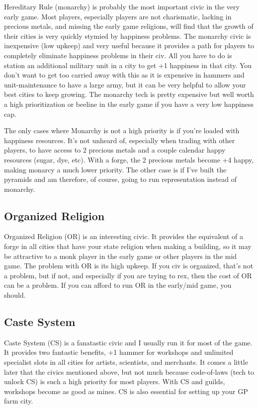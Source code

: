 \documentclass[10pt]{article}
\begin{document}
Hereditary Rule (monarchy) is probably the most important civic in the
very early game. Most players, especially players are not charismatic,
lacking in precious metals, and missing the early game religions, will
find that the growth of their cities is very quickly stymied by
happiness problems. The monarchy civic is inexpensive (low upkeep) and
very useful because it provides a path for players to completely
eliminate happiness problems in their civ. All you have to do is
station an additional military unit in a city to get +1 happiness in
that city. You don't want to get too carried away with this as it is
expensive in hammers and unit-maintenance to have a large army, but it
can be very helpful to allow your best cities to keep growing. The
monarchy tech is pretty expensive but well worth a high prioritization
or beeline in the early game if you have a very low happiness cap.

The only cases where Monarchy is not a high priority is if you're
loaded with happiness resources. It's not unheard of, especially when
trading with other players, to have access to 2 precious metals and a
couple calendar happy resources (sugar, dye, etc). With a forge, the 2
precious metals become +4 happy, making monarcy a much lower
priority. The other case is if I've built the pyramids and am
therefore, of course, going to run representation instead of monarchy.

\subsection*{Organized Religion}

Organized Religion (OR) is an interesting civic. It provides the
equivalent of a forge in all cities that have your state religion when
making a building, so it may be attractive to a monk player in the
early game or other players in the mid game. The problem with OR is
its high upkeep. If you civ is organized, that's not a problem, but if
not, and especially if you are trying to rex, then the cost of OR can
be a problem. If you can afford to run OR in the early/mid game, you
should.

\subsection*{Caste System}

Caste System (CS) is a fanatastic civic and I usually run it for most
of the game. It provides two fantastic benefits, +1 hammer for
workshops and unlimited specialist slots in all cities for artists,
scientists, and merchants. It comes a little later that the civics
mentioned above, but not much because code-of-laws (tech to unlock CS)
is such a high priority for most players. With CS and guilds,
workshops become as good as mines. CS is also essential for setting up
your GP farm city.
\end{document}
